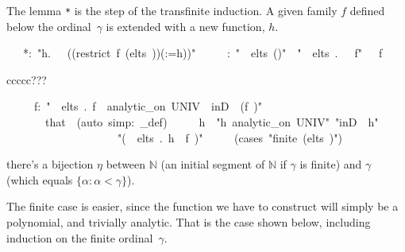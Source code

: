 \documentclass[runningheads]{llncs}
\begin{document}
The lemma \texttt{*} is the step of the transfinite induction.
A given family $f$ defined below the ordinal~$\gamma$ is extended with a new function, $h$.

\begin{isabelle}
\ \ \ *:\ "\isasymexists h.\ \isasymPhi \ \isasymgamma \ ((restrict\ f\ (elts\ \isasymgamma ))(\isasymgamma :=h))"\isanewline
\ \ \ \ \ \isasymgamma :\ "\isasymgamma \ \isasymin \ elts\ ()"\ \ "\isasymforall \isasymbeta \ \isasymin \ elts\ \isasymgamma .\ \isasymPhi \ \isasymbeta \ f"\ \ \isasymgamma \ f
\end{isabelle}

\noindent

ccccc???
\begin{isabelle}
\ \ \ \ \ f:\ "\isasymforall \isasymbeta \ \isasymin \ elts\ \isasymgamma .\ f\ \isasymbeta \ analytic\_on\ UNIV\ \isasymand \ inD\ \isasymbeta \ (f\ \isasymbeta )"\ \isanewline
\ \ \ \ \ \ \ that\ \ (auto\ simp:\ \isasymPhi \_def)\isanewline
\ \ \ \ \ h\ \ "h\ analytic\_on\ UNIV"\ "inD\ \isasymgamma \ h"\isanewline
\ \ \ \ \ \ \ \ \ \ \ \ \ \ \ \ \ \ \ \ "(\isasymforall \isasymbeta \ \isasymin \ elts\ \isasymgamma .\ h\ \isasymnoteq \ f\ \isasymbeta )"\isanewline
\ \ \ \ \ (cases\ "finite\ (elts\ \isasymgamma )")
\end{isabelle}

there's a bijection $\eta$ between $\mathbb{N}$ (an initial segment of $\mathbb{N}$ if $\gamma$ is finite) and $\gamma$ (which equals $\{\alpha:\alpha<\gamma\}$). 

  
The finite case is easier, since the function we have to construct will simply be a polynomial, and trivially analytic. That is the case shown below, including induction on the finite ordinal~$\gamma$. 
\end{document}
